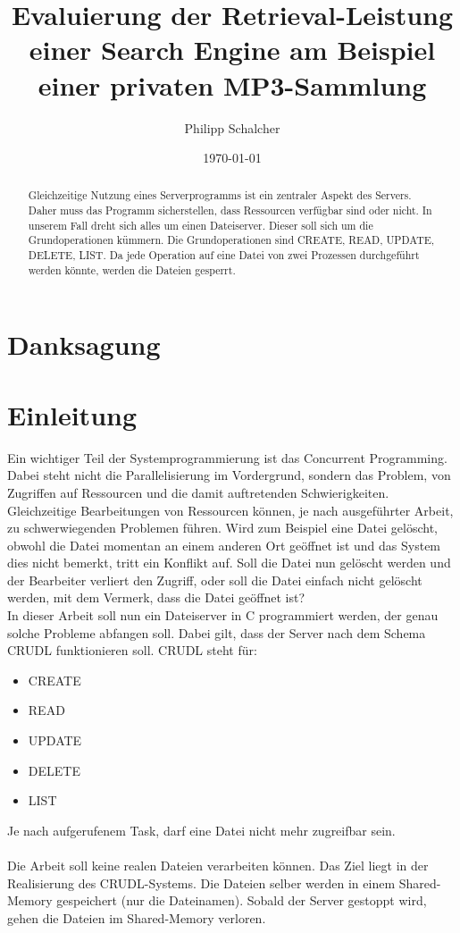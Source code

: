 \documentclass[12pt,a4paper,ngerman]{report}
\author{Philipp Schalcher}
\title{Evaluierung der Retrieval-Leistung einer Search Engine am Beispiel einer privaten MP3-Sammlung}
\date{\today}
\begin{document}

\chapter*{Danksagung}
\tableofcontents
\begin{abstract}
Gleichzeitige Nutzung eines Serverprogramms  ist ein zentraler Aspekt des Servers. Daher muss das Programm sicherstellen, dass Ressourcen verfügbar sind oder nicht. In unserem Fall dreht sich alles um einen Dateiserver. Dieser soll sich um die Grundoperationen kümmern. Die Grundoperationen sind CREATE, READ, UPDATE, DELETE, LIST. Da jede Operation auf eine Datei von zwei Prozessen durchgeführt werden könnte, werden die Dateien gesperrt.
\end{abstract}
\chapter*{Einleitung}
Ein wichtiger Teil der Systemprogrammierung ist das Concurrent Programming. Dabei steht nicht die Parallelisierung im Vordergrund, sondern das Problem, von Zugriffen auf Ressourcen und die damit auftretenden Schwierigkeiten. Gleichzeitige Bearbeitungen von Ressourcen können, je nach ausgeführter Arbeit, zu schwerwiegenden Problemen führen. Wird zum Beispiel eine Datei gelöscht, obwohl die Datei momentan an einem anderen Ort geöffnet ist und das System dies nicht bemerkt, tritt ein Konflikt auf. Soll die Datei nun gelöscht werden und der Bearbeiter verliert den Zugriff, oder soll die Datei einfach nicht gelöscht werden, mit dem Vermerk, dass die Datei geöffnet ist?
\\
In dieser Arbeit soll nun ein Dateiserver in C programmiert werden, der genau solche Probleme abfangen soll. Dabei gilt, dass der Server nach dem Schema CRUDL funktionieren soll. CRUDL steht für:
\begin{itemize}
	\item CREATE
	\item READ
	\item UPDATE
	\item DELETE
	\item LIST
\end{itemize}
Je nach aufgerufenem Task, darf eine Datei nicht mehr zugreifbar sein.
\\
\\
Die Arbeit soll keine realen Dateien verarbeiten können. Das Ziel liegt in der Realisierung des CRUDL-Systems. Die Dateien selber werden in einem Shared-Memory gespeichert (nur die Dateinamen). Sobald der Server gestoppt wird, gehen die Dateien im Shared-Memory verloren.
\end{document}
